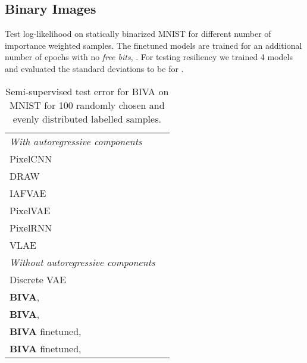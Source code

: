\documentclass{article}
\def\nm{BIVA\xspace}
\def\abovestrut#1{\rule[0in]{0in}{#1}\ignorespaces}
\def\abovespace{\abovestrut{0.20in}}
\begin{document}
\subsection{Binary Images}
\begin{table}[t]
\begin{minipage}{0.48\textwidth}
\begin{small}
\begin{sc}
{\caption{Test log-likelihood on statically binarized MNIST for different number of importance weighted samples. The finetuned models are trained for an additional number of epochs with no \textit{free bits}, . For testing resiliency we trained 4 models and evaluated the standard deviations to be  for .}\label{table:bin_mnist}}
\begin{tabular}{l c}
 &  \\
\hline
\textit{With autoregressive components} \\
PixelCNN {\scriptsize\cite{Oord2015}} & \\
DRAW {\scriptsize\cite{Gregor15}} & \\
IAFVAE {\scriptsize\cite{Kingma2016}} & \\
PixelVAE {\scriptsize\cite{Gulrajani2016}} & \\
PixelRNN {\scriptsize\cite{Oord2015}} & \\
VLAE {\scriptsize\cite{Chen2017}} & \\
\hline
 \textit{Without autoregressive components} \\
 Discrete VAE {\scriptsize\cite{Rolfe2017}} & \\
\abovespace
\textbf{\nm},  &  \\
\textbf{\nm},  &  \\
\textbf{\nm} finetuned,  &  \\
\textbf{\nm} finetuned,  &  \\
\hline
\end{tabular}\end{sc}
\end{small}
\end{minipage}
\hfill
\begin{minipage}{0.49\textwidth}
\vspace*{-2.4cm}
\caption{Semi-supervised test error for \nm on MNIST for 100 randomly chosen and evenly distributed labelled samples.}\label{table:semisupervised}
\vspace{-0.6cm}
\begin{center}
\begin{small}
\begin{sc}

\end{sc}
\end{small}
\end{center}
\end{minipage}
\end{table}
\end{document}
